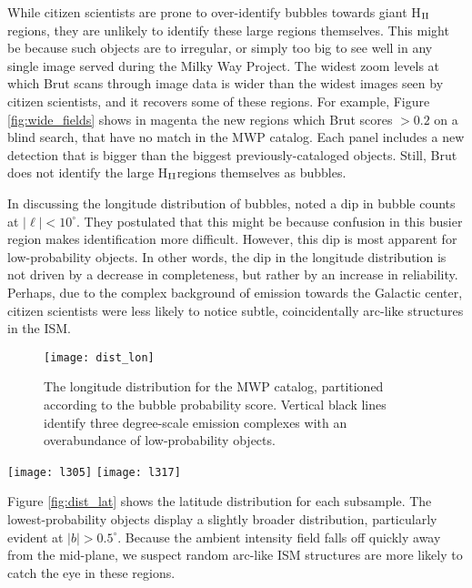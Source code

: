 \documentclass[preprint]{aastex}
\newcommand{\hii}[0]{H$_{\rm II}$}
\begin{document}
While citizen scientists are prone to over-identify bubbles towards giant \hii\, regions, they are unlikely to identify these large regions themselves. This might be because such objects are to irregular, or simply too big to see well in any single image served during the Milky Way Project. The widest zoom levels at which Brut scans through image data is wider than the widest images seen by citizen scientists, and it recovers some of these regions. For example, Figure \ref{fig:wide_fields} shows in magenta the new regions which Brut scores $>0.2$ on a blind search, that have no match in the MWP catalog. Each panel includes a new detection that is bigger than the biggest previously-cataloged objects. Still, Brut does not identify the large \hii regions themselves as bubbles. 

In discussing the longitude distribution of bubbles, \cite{Simpson12} noted a dip in bubble counts at $|\ell| < 10^\circ$. They postulated that this might be because confusion in this busier region makes identification more difficult. However, this dip is most apparent for low-probability objects. In other words, the dip in the longitude distribution is not driven by a decrease in completeness, but rather by an increase in reliability. Perhaps, due to the complex background of emission towards the Galactic center, citizen scientists were less likely to notice subtle, coincidentally arc-like structures in the ISM.

\begin{figure}[h!]
\texttt{[image: dist\_lon]}
\caption{The longitude distribution for the MWP catalog, partitioned according to the bubble probability score.
Vertical black lines identify three degree-scale emission complexes with an overabundance of low-probability objects.}
\label{fig:dist_lon}
\end{figure}


\begin{figure*}
\texttt{[image: l305]}
\texttt{[image: l317]}
\caption{Two fields with overabundances of low-probability bubbles in the MWP catalog.}
\label{fig:wide_fields}
\end{figure*}

Figure \ref{fig:dist_lat} shows the latitude distribution for each subsample. The lowest-probability objects display a slightly broader distribution, particularly evident at $|b| > 0.5^\circ$. Because the ambient intensity field falls off quickly away from the mid-plane, we suspect random arc-like ISM structures are more likely to catch the eye in these regions. 
\end{document}
